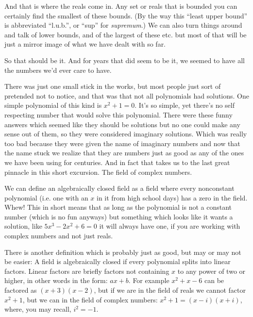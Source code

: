 And that is where the reals come in. Any set or reals that is bounded
you can certainly find the smallest of these bounds. (By the way
this ``least upper bound'' is abbreviated ``l.u.b.'', or ``sup'' for
{\it supremum}.) We can also turn things around and talk of lower
bounds, and of the largest of these etc. but most of that will be
just a mirror image of what we have dealt with so far.

So that should be it. And for years that did seem to be it, we seemed
to have all the numbers we'd ever care to have. 

There was just one small stick in the works, but most people just sort 
of pretended not to notice, and that was that not all polynomials had
solutions. One simple polynomial of this kind is $x^2 + 1 = 0$.
It's so simple, yet there's no self respecting number that would 
solve this polynomial. There were these funny
answers which seemed like they should be solutions but no one could
make any sense out of them, so they were considered imaginary
solutions.
Which was really too bad because they were given the name of imaginary
numbers
and now that the name stuck we realize that they are numbers just as
good as
any of the ones we have been using for centuries. And in fact that
takes us to
the last great pinnacle in this short excursion. The field of complex
numbers. 

We can define an algebraically closed field as a field where every
nonconstant
polynomial (i.e. one with an $x$ in it from high school days) has a
zero
in the field. Whew! This in short means that as long as the polynomial
is not a constant number (which is no fun anyways) but something which
looks like it wants a solution, like $5 x^3 - 2 x^2 + 6 = 0$ it will
always have one, if you are working with complex numbers and not just
reals.


There is another definition which is probably just as good, but may or 
may not be easier: A field is algebraically closed if every polynomial
splits
into linear factors. 
Linear factors are briefly factors not containing $x$ to any power of
two or higher, in other words in the form: $ax + b$. For example
$x^2 + x -6$ can be factored as $(x + 3)(x - 2)$, but if we are in the
field of reals we cannot factor $x^2 + 1$, but we can in the field of
complex numbers: $x^2 + 1 = (x - i)(x + i)$, where, you may recall,
$i^2 = -1$.


%



